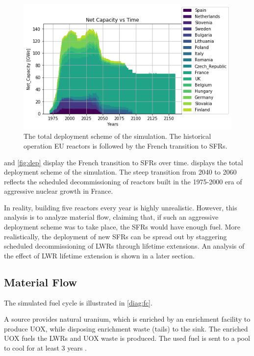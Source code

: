 \begin{figure}[htbp!]
    \begin{center}
        \includegraphics[scale=0.6]{./images/eu_future/onesim.png}
    \end{center}
    \caption{The total deployment scheme of the simulation. The historical
             operation \gls{EU} reactors is followed by the French
             transition to \glspl{SFR}.}
    \label{fig:tot_dep}
\end{figure}


 and \ref{fig:dep} display
the French transition to \glspl{SFR} over time.
 displays the total deployment
scheme of the simulation.
The steep transition from 2040 to 2060 reflects the scheduled
decommissioning of reactors built in the 1975-2000
era of aggressive nuclear growth in France.

In reality, building five reactors every year is highly unrealistic. However,
this analysis is to analyze material flow, claiming that, if such an aggressive
deployment scheme was to take place, the \glspl{SFR} would have enough fuel.
More realistically, the deployment of new \glspl{SFR} can be spread out by
staggering scheduled decommissioning of \glspl{LWR} through lifetime extensions.
An analysis of the effect of \gls{LWR} lifetime extension is shown in a later section.



\subsection{Material Flow}
The simulated fuel cycle is illustrated in \cref{diag:fc}.

A source provides natural uranium, which is enriched by an enrichment
facility to produce \gls{UOX}, while disposing enrichment waste (tails)
to the sink. The enriched \gls{UOX} fuels
the \gls{LWR}s and \gls{UOX} waste is produced. The used fuel
is sent to a pool to cool for at least 3 years \cite{carre_overview_2009}.

